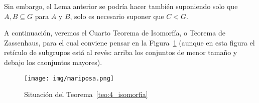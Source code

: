 \begin{observacion}
    Sin embargo, el Lema anterior se podría hacer también suponiendo solo que $A,B\subseteq G$ para $A$ y $B$, solo es necesario suponer que $C<G$.
\end{observacion}


\noindent
A continuación, veremos el Cuarto Teorema de Isomorfía, o Teorema de Zassenhaus, para el cual conviene pensar en la Figura~\ref{fig:4_isomorfia} (aunque en esta figura el retículo de subgrupos está al revés: arriba los conjuntos de menor tamaño y debajo los caonjuntos mayores).

\begin{figure}[H]
    \centering
    \texttt{[image: img/mariposa.png]}
    \caption{Situación del Teorema~\ref{teo:4_isomorfia}}
    \label{fig:4_isomorfia}
\end{figure}

